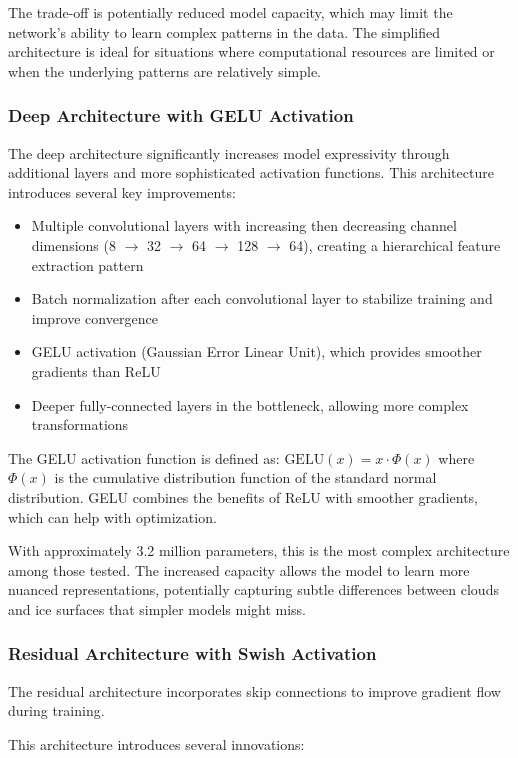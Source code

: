 \documentclass[10pt,letterpaper]{article}
\begin{document}
The trade-off is potentially reduced model capacity, which may limit the network's ability to learn complex patterns in the data. The simplified architecture is ideal for situations where computational resources are limited or when the underlying patterns are relatively simple.

\subsubsection{Deep Architecture with GELU Activation}
The deep architecture significantly increases model expressivity through additional layers and more sophisticated activation functions. This architecture introduces several key improvements:

\begin{itemize}
\item Multiple convolutional layers with increasing then decreasing channel dimensions (8 $\to$ 32 $\to$ 64 $\to$ 128 $\to$ 64), creating a hierarchical feature extraction pattern
\item Batch normalization after each convolutional layer to stabilize training and improve convergence
\item GELU activation (Gaussian Error Linear Unit), which provides smoother gradients than ReLU
\item Deeper fully-connected layers in the bottleneck, allowing more complex transformations
\end{itemize}

The GELU activation function is defined as:
$\text{GELU}(x) = x \cdot \Phi(x)$ where $\Phi(x)$ is the cumulative distribution function of the standard normal distribution. GELU combines the benefits of ReLU with smoother gradients, which can help with optimization.

With approximately 3.2 million parameters, this is the most complex architecture among those tested. The increased capacity allows the model to learn more nuanced representations, potentially capturing subtle differences between clouds and ice surfaces that simpler models might miss.


\subsubsection{Residual Architecture with Swish Activation}

The residual architecture incorporates skip connections to improve gradient flow during training. 

This architecture introduces several innovations:
\end{document}
